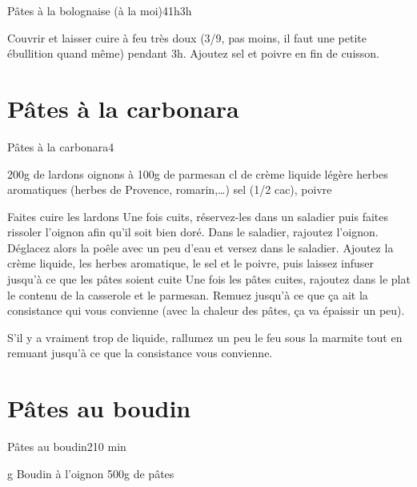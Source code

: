 {\begin{recette}{Pâtes à la bolognaise (à la moi)}{4}{1h}{3h}
\begin{cuisson}
Couvrir et laisser cuire à feu très doux (3/9, pas moins, il faut une petite ébullition quand même) pendant 3h. Ajoutez sel et poivre en fin de cuisson.
\end{cuisson}
\end{recette}\label{sec:bolognaise}

\section{Pâtes à la carbonara}
\begin{recette}{Pâtes à la carbonara}{4}{}{}
\begin{ingredients}
\ingredient 200g de lardons
 oignons
 à 100g de parmesan
 cl de crème liquide légère 
\ingredient herbes aromatiques (herbes de Provence, romarin,\dots)
\ingredient sel (1/2 cac), poivre
\end{ingredients}

\begin{preparation}
\etape Faites cuire les lardons
\etape Une fois cuits, réservez-les dans un saladier puis faites rissoler l'oignon afin qu'il soit bien doré.
\etape Dans le saladier, rajoutez l'oignon. Déglacez alors la poêle avec un peu d'eau et versez dans le saladier.
\etape Ajoutez la crème liquide, les herbes aromatique, le sel et le poivre, puis laissez infuser jusqu'à ce que les pâtes soient cuite
\etape Une fois les pâtes cuites, rajoutez dans le plat le contenu de la casserole et le parmesan. Remuez jusqu'à ce que ça ait la consistance qui vous convienne (avec la chaleur des pâtes, ça va épaissir un peu).
\begin{remarque}
S'il y a vraiment trop de liquide, rallumez un peu le feu sous la marmite tout en remuant jusqu'à ce que la consistance vous convienne.
\end{remarque}
\end{preparation}

\end{recette}

\section{Pâtes au boudin}
\begin{recette}{Pâtes au boudin}{2}{10 min}{}
\begin{ingredients}
 g Boudin à l'oignon
\ingredient 500g de pâtes
\end{ingredients}


\end{recette}}
